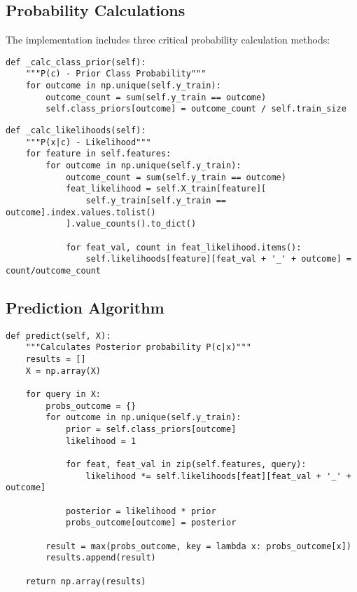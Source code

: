 \documentclass[11pt,a4paper]{article}
\begin{document}
\subsection{Probability Calculations}

The implementation includes three critical probability calculation methods:

\begin{lstlisting}[caption=Prior Probability Calculation]
def _calc_class_prior(self):
    """P(c) - Prior Class Probability"""
    for outcome in np.unique(self.y_train):
        outcome_count = sum(self.y_train == outcome)
        self.class_priors[outcome] = outcome_count / self.train_size
\end{lstlisting}

\begin{lstlisting}[caption=Likelihood Calculation]
def _calc_likelihoods(self):
    """P(x|c) - Likelihood"""
    for feature in self.features:
        for outcome in np.unique(self.y_train):
            outcome_count = sum(self.y_train == outcome)
            feat_likelihood = self.X_train[feature][
                self.y_train[self.y_train == outcome].index.values.tolist()
            ].value_counts().to_dict()
            
            for feat_val, count in feat_likelihood.items():
                self.likelihoods[feature][feat_val + '_' + outcome] = count/outcome_count
\end{lstlisting}

\subsection{Prediction Algorithm}

\begin{lstlisting}[caption=Prediction Method]
def predict(self, X):
    """Calculates Posterior probability P(c|x)"""
    results = []
    X = np.array(X)
    
    for query in X:
        probs_outcome = {}
        for outcome in np.unique(self.y_train):
            prior = self.class_priors[outcome]
            likelihood = 1
            
            for feat, feat_val in zip(self.features, query):
                likelihood *= self.likelihoods[feat][feat_val + '_' + outcome]
            
            posterior = likelihood * prior
            probs_outcome[outcome] = posterior
        
        result = max(probs_outcome, key = lambda x: probs_outcome[x])
        results.append(result)
    
    return np.array(results)
\end{lstlisting}
\end{document}

